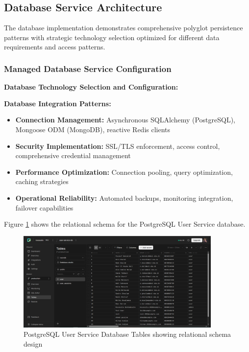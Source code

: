 \subsection{Database Service Architecture}

The database implementation demonstrates comprehensive polyglot persistence patterns with strategic technology selection optimized for different data requirements and access patterns.

\subsubsection{Managed Database Service Configuration}

\textbf{Database Technology Selection and Configuration:}



\textbf{Database Integration Patterns:}
\begin{itemize}
\item \textbf{Connection Management:} Asynchronous SQLAlchemy (PostgreSQL), Mongoose ODM (MongoDB), reactive Redis clients
\item \textbf{Security Implementation:} SSL/TLS enforcement, access control, comprehensive credential management
\item \textbf{Performance Optimization:} Connection pooling, query optimization, caching strategies
\item \textbf{Operational Reliability:} Automated backups, monitoring integration, failover capabilities
\end{itemize}

Figure \ref{fig:postgresql-user-tables} shows the relational schema for the PostgreSQL User Service database.

\begin{figure}[H]
\centering
\includegraphics[width=0.9\textwidth]{figures/chapter5/postgresql-database-user-tables.png}
\caption{PostgreSQL User Service Database Tables showing relational schema design}
\label{fig:postgresql-user-tables}
\end{figure}

